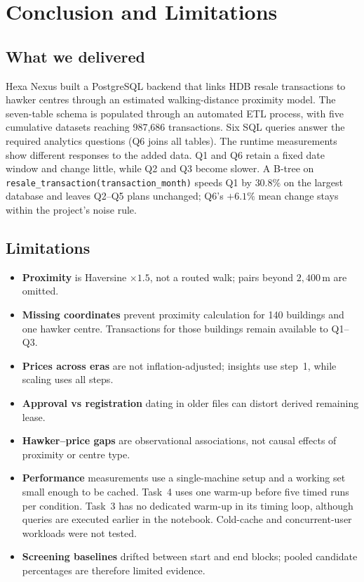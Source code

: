 \section{Conclusion and Limitations}

\subsection{What we delivered}
Hexa Nexus built a PostgreSQL backend that links HDB resale transactions to hawker centres through an estimated walking-distance proximity model.
The seven-table schema is populated through an automated ETL process, with five cumulative datasets reaching 987{,}686 transactions.
Six SQL queries answer the required analytics questions (Q6 joins all tables).
The runtime measurements show different responses to the added data. Q1 and Q6 retain a fixed date window and change little, while Q2 and Q3 become slower.
A B-tree on \texttt{resale\_transaction(transaction\_month)} speeds Q1 by $30.8\%$ on the largest database and leaves Q2--Q5 plans unchanged; Q6's $+6.1\%$ mean change stays within the project's noise rule.

\subsection{Limitations}
\begin{itemize}
  \item \textbf{Proximity} is Haversine $\times 1.5$, not a routed walk; pairs beyond $2{,}400\,\mathrm{m}$ are omitted.
  \item \textbf{Missing coordinates} prevent proximity calculation for 140 buildings and one hawker centre. Transactions for those buildings remain available to Q1--Q3.
  \item \textbf{Prices across eras} are not inflation-adjusted; insights use step~1, while scaling uses all steps.
  \item \textbf{Approval vs registration} dating in older files can distort derived remaining lease.
  \item \textbf{Hawker--price gaps} are observational associations, not causal effects of proximity or centre type.
  \item \textbf{Performance} measurements use a single-machine setup and a working set small enough to be cached. Task~4 uses one warm-up before five timed runs per condition. Task~3 has no dedicated warm-up in its timing loop, although queries are executed earlier in the notebook. Cold-cache and concurrent-user workloads were not tested.
  \item \textbf{Screening baselines} drifted between start and end blocks; pooled candidate percentages are therefore limited evidence.
\end{itemize}
